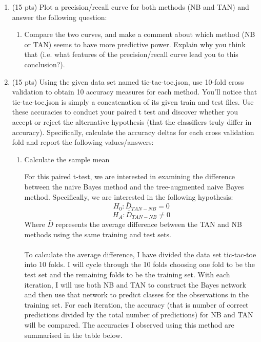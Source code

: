 \documentclass{article}
\newenvironment{soln}{
	\leavevmode\color{blue}\ignorespaces
}{}
\begin{document}
\begin{enumerate}
\item  (15 pts) Plot a precision/recall curve for both methods (NB and TAN) and answer the following question:
\begin{enumerate}
\item Compare the two curves, and make a comment about which method (NB or TAN) seems to have more predictive power. Explain why you think that (i.e. what features of the precision/recall curve lead you to this conclusion?).

\end{enumerate}

\item (15 pts) Using the given data set named tic-tac-toe.json, use 10-fold cross validation to obtain 10 accuracy measures for each method. You’ll notice that tic-tac-toe.json is simply a concatenation of its given train and test files. Use these accuracies to conduct your paired t test and discover whether you accept or reject the alternative hypothesis (that the classifiers truly differ in accuracy). Specifically, calculate the accuracy deltas for each cross validation fold and report the following values/answers:
\begin{enumerate}
\item Calculate the sample mean \\ 
\begin{soln}
For this paired t-test, we are interested in examining the difference between the naive Bayes method and the tree-augmented naive Bayes method. Specifically, we are interested in the following hypothesis:
\[H_0: \bar{D}_{TAN - NB} = 0\]
\[H_A: \bar{D}_{TAN - NB} \neq 0\]
Where $\bar{D}$ represents the average difference between the TAN and NB methods using the same training and test sets. \\ \\
To calculate the average difference, I have divided the data set tic-tac-toe into 10 folds. I will cycle through the 10 folds choosing one fold to be the test set and the remaining folds to be the training set. With each iteration, I will use both NB and TAN to construct the Bayes network and then use that network to predict classes for the observations in the training set. For each iteration, the accuracy (that is number of correct predictions divided by the total number of predictions) for NB and TAN will be compared. The accuracies I observed using this method are summarised in the table below. \\


\end{soln}
\end{enumerate}
\end{enumerate}
\end{document}
